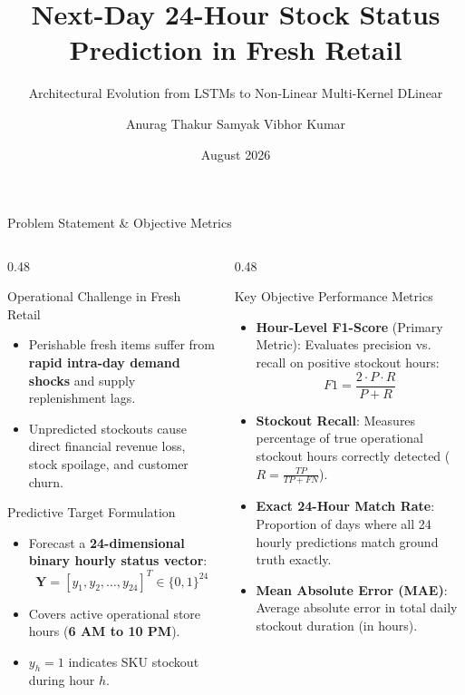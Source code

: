 \documentclass[10pt, aspectratio=169]{beamer}
\title[Next-Day 24-Hour Stock Status Prediction]{Next-Day 24-Hour Stock Status Prediction in Fresh Retail}
\subtitle{Architectural Evolution from LSTMs to Non-Linear Multi-Kernel DLinear}
\author[Anurag, Samyak, Vibhor]{Anurag Thakur \quad Samyak \quad Vibhor Kumar}
\institute[BTP 2026]{Department of Information Technology\\Bachelor of Technology Project (BTP)}
\date{August 2026}
\begin{document}
\begin{frame}
  \titlepage
\end{frame}

\begin{frame}{Problem Statement \& Objective Metrics}
  \begin{columns}[T]
    \begin{column}{0.48\textwidth}
      \begin{block}{Operational Challenge in Fresh Retail}
        \begin{itemize}
          \item Perishable fresh items suffer from \textbf{rapid intra-day demand shocks} and supply replenishment lags.
          \item Unpredicted stockouts cause direct financial revenue loss, stock spoilage, and customer churn.
        \end{itemize}
      \end{block}
      
      \begin{block}{Predictive Target Formulation}
        \begin{itemize}
          \item Forecast a \textbf{24-dimensional binary hourly status vector}:
            $$\mathbf{Y} = [y_1, y_2, \dots, y_{24}]^T \in \{0, 1\}^{24}$$
          \item Covers active operational store hours (\textbf{6 AM to 10 PM}).
          \item $y_h = 1$ indicates SKU stockout during hour $h$.
        \end{itemize}
      \end{block}
    \end{column}
    
    \begin{column}{0.48\textwidth}
      \begin{exampleblock}{Key Objective Performance Metrics}
        \begin{itemize}
          \item \textbf{Hour-Level F1-Score} (Primary Metric): Evaluates precision vs. recall on positive stockout hours:
            $$F1 = \frac{2 \cdot P \cdot R}{P + R}$$
          \item \textbf{Stockout Recall}: Measures percentage of true operational stockout hours correctly detected ($R = \frac{TP}{TP + FN}$).
          \item \textbf{Exact 24-Hour Match Rate}: Proportion of days where all 24 hourly predictions match ground truth exactly.
          \item \textbf{Mean Absolute Error (MAE)}: Average absolute error in total daily stockout duration (in hours).
        \end{itemize}
      \end{exampleblock}
    \end{column}
  \end{columns}
\end{frame}
\end{document}
